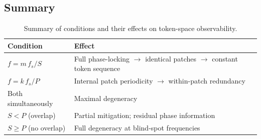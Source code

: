 \subsection{Summary}

\begin{table}[h]
    \centering
    \begin{tabular}{@{}ll@{}}
        \toprule
        \textbf{Condition} & \textbf{Effect} \\
        \midrule
        $f = m\,f_s/S$ & Full phase-locking $\to$ identical patches $\to$ constant token sequence \\
        $f = k\,f_s/P$ & Internal patch periodicity $\to$ within-patch redundancy \\
        Both simultaneously & Maximal degeneracy \\
        $S < P$ (overlap) & Partial mitigation; residual phase information \\
        $S \geq P$ (no overlap) & Full degeneracy at blind-spot frequencies \\
        \bottomrule
    \end{tabular}
    \caption{Summary of conditions and their effects on token-space observability.}
\end{table}
